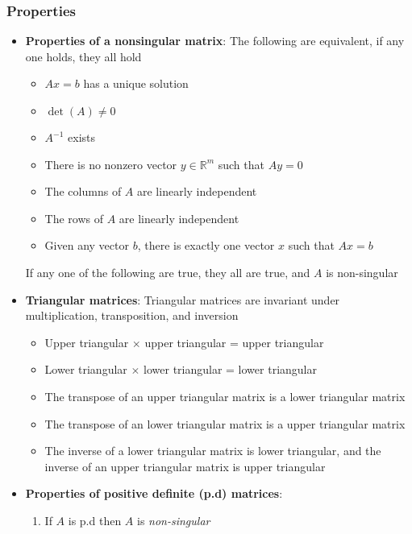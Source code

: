\documentclass{report}
\begin{document}
    \subsubsection{Properties}
    \begin{itemize}
        \item \textbf{Properties of a nonsingular matrix}:
            The following are equivalent, if any one holds, they all hold
            \begin{itemize}
                \item $Ax = b$ has a unique solution
                \item $\det(A)\ne 0$
                \item $A^{-1}$ exists
                \item There is no nonzero vector $y \in \mathbb{R}^{m}$ such that $Ay=0 $
                \item The columns of $A$ are linearly independent
                \item The rows of $A$ are linearly independent
                \item Given any vector $b$, there is exactly one vector $x$ such that $Ax=b$
            \end{itemize}
            If any one of the following are true, they all are true, and $A$ is non-singular
        \item \textbf{Triangular matrices}: 
            Triangular matrices are invariant under multiplication, transposition, and inversion
            \begin{itemize}
                \item Upper triangular $\times$ upper triangular = upper triangular
                \item Lower triangular $\times$ lower triangular = lower triangular
                \item The transpose of an upper triangular matrix is a lower triangular matrix
                \item The transpose of an lower triangular matrix is a upper triangular matrix
                \item The inverse of a lower triangular matrix is lower triangular, and the inverse of an upper triangular matrix is upper triangular
            \end{itemize}
        \item \textbf{Properties of positive definite (p.d) matrices}:
            \begin{enumerate}
                \item If $A$ is p.d then $A$ is \textit{non-singular}

\end{enumerate}
\end{itemize}
\end{document}
